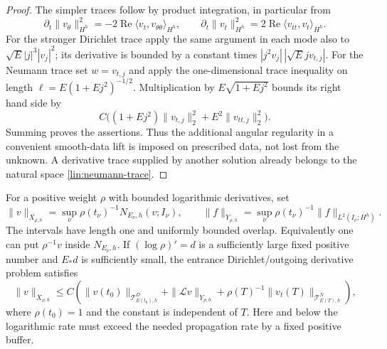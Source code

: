 \begin{proof}
The simpler traces follow by product integration, in particular from
\[
 \partial_t\|v_\theta\|_{H^h}^2
 =-2\operatorname{Re}\langle v_t,v_{\theta\theta}\rangle_{H^h},
 \qquad
 \partial_t\|v_t\|_{H^h}^2
 =2\operatorname{Re}\langle v_{tt},v_t\rangle_{H^h}.
\]
For the stronger Dirichlet trace apply the same argument in each mode
also to $\sqrt E|j|^3|v_j|^2$; its derivative is bounded by a constant
times $|j^2v_j|\,|\sqrt E jv_{t,j}|$.  For the Neumann trace set
$w=v_{t,j}$ and apply the one-dimensional trace inequality on length
$\ell=E(1+Ej^2)^{-1/2}$.  Multiplication by
$E\sqrt{1+Ej^2}$ bounds its right hand side by
\[
 C\bigl((1+Ej^2)\|v_{t,j}\|_2^2
                         +E^2\|v_{tt,j}\|_2^2\bigr).
\]
Summing proves the assertions.  Thus the additional angular regularity
in a convenient smooth-data lift is imposed on prescribed data, not
lost from the unknown.  A derivative trace supplied by another solution
already belongs to the natural space \eqref{lin:neumann-trace}.
\end{proof}

For a positive weight $\rho$ with bounded logarithmic derivatives, set
\begin{equation}\label{lin:weighted-strip}
 \|v\|_{X_{\rho,h}}
   =\sup_\nu\rho(t_\nu)^{-1}N_{E_\nu,h}(v;I_\nu),\qquad
 \|f\|_{Y_{\rho,h}}
   =\sup_\nu\rho(t_\nu)^{-1}\|f\|_{L^2(I_\nu;H^h)}.
\end{equation}
The intervals have length one and uniformly bounded overlap.
Equivalently one can put $\rho^{-1}v$ inside $N_{E_\nu,h}$.  If
$(\log\rho)'=d$ is a sufficiently large fixed positive number and
$E_*d$ is sufficiently small, the entrance Dirichlet/outgoing
derivative problem satisfies
\begin{equation}\label{lin:forward}
 \|v\|_{X_{\rho,h}}
 \le C\left(\|v(t_0)\|_{\mathcal T^D_{E(t_0),h}}
       +\|\mathcal Lv\|_{Y_{\rho,h}}
       +\rho(T)^{-1}\|v_t(T)\|_{\mathcal T^N_{E(T),h}}\right),
\end{equation}
where $\rho(t_0)=1$ and the constant is independent of $T$.
Here and below the logarithmic rate must exceed the needed propagation
rate by a fixed positive buffer.

